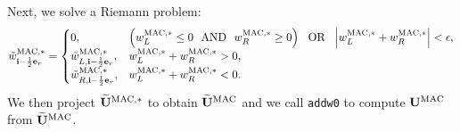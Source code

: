 \documentclass[11pt]{article}
\def\half  {\frac{1}{2}}
\def\mac   {\rm MAC}
\def\eb    {{\bf e}}
\def\ib    {{\bf i}}
\def\Ub    {{\bf U}}
\def\Ubt   {\widetilde{\bf U}}
\def\wt    {\tilde{w}}
\begin{document}
Next, we solve a Riemann problem:
\begin{equation}
\wt_{\ib-\half\eb_r}^{\mac,*} =
\begin{cases}
0, & \left(w_L^{\mac,*} \le 0 ~~ {\rm AND} ~~ w_R^{\mac,*} \ge 0\right) ~~ {\rm OR} ~~ \left|w_L^{\mac,*} + w_R^{\mac,*}\right| < \epsilon, \\
\wt_{L,\ib-\half\eb_r}^{\mac,*}, & w_L^{\mac,*} + w_R^{\mac,*} > 0, \\
\wt_{R,\ib-\half\eb_r}^{\mac,*}, & w_L^{\mac,*} + w_R^{\mac,*} < 0. 
\end{cases}
\end{equation}
We then project $\Ubt^{\mac,*}$ to obtain $\Ubt^{\mac}$ and we call {\tt addw0} to compute $\Ub^{\mac}$ from $\Ubt^{\mac}$.
\cleardoublepage
\end{document}
